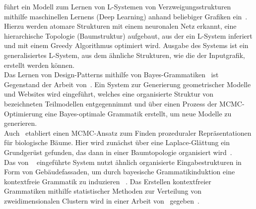 \citeauthor{guo_2020} führt ein Modell zum Lernen von L-Systemen von Verzweigungsstrukturen mithilfe maschinellen
Lernens (Deep Learning) anhand beliebiger Grafiken ein~\cite{guo_2020}.
Hierzu werden atomare Strukturen mit einem neuronalen Netz erkannt, eine hierarchische Topologie (Baumstruktur)
aufgebaut, aus der ein L-System inferiert und mit einem Greedy Algorithmus optimiert wird.
Ausgabe des Systems ist ein generalisiertes L-System, aus dem ähnliche Strukturen, wie die der Inputgrafik,
erstellt werden können.\\
Das Lernen von Design-Patterns mithilfe von Bayes-Grammatiken~\cite{talton_2012} ist Gegenstand der Arbeit von~\citeauthor{talton_2012}.
Ein System zur Generierung geometrischer Modelle und Websites wird eingeführt, welches eine organisierte
Struktur von bezeichneten Teilmodellen entgegennimmt und über einen Prozess der MCMC-Optimierung eine Bayes-optimale
Grammatik erstellt, um neue Modelle zu generieren.\\
Auch~\citeauthor{stava_2014} etabliert einen MCMC-Ansatz zum Finden prozeduraler Repräsentationen für biologische Bäume.
Hier wird zunächst über eine Laplace-Glättung ein Grundgerüst gefunden, das dann in einer Baumtopologie organisiert wird~\cite{stava_2014}.\\
Das von ~\citeauthor{martinovic_2013} eingeführte System nutzt ähnlich organisierte Eingabestrukturen in Form von
Gebäudefassaden, um durch bayesische Grammatikinduktion eine kontextfreie Grammatik zu induzieren ~\cite{martinovic_2013}.
Das Erstellen kontextfreier Grammatiken mithilfe statistischer Methoden zur Verteilung von zweidimensionalen Clustern
wird in einer Arbeit von~\citeauthor{stava_2010} gegeben~\cite{stava_2010}.